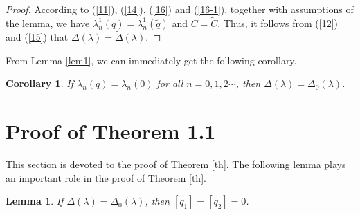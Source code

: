 \documentclass[reqno,11pt,centertags]{amsart}
\numberwithin{equation}{section}
\newtheorem{lemma}[theorem]{Lemma}
\newtheorem{corollary}[theorem]{Corollary}
\theoremstyle{definition}
\begin{document}
\begin{proof}
According to (\ref{11}), (\ref{14}), (\ref{16}) and (\ref{16-1}), together with assumptions of the lemma, we have $\lambda_{n}^{1}(q)=\lambda_{n}^{1}(\widetilde{q})$ and $C=\widetilde{C}$. Thus, it follows from (\ref{12}) and (\ref{15}) that $\Delta(\lambda)=\widetilde{\Delta}(\lambda)$.
\end{proof}


From Lemma \ref{lem1}, we can immediately get the following corollary.
\begin{corollary}\label{cor}
If $\lambda_{n}(q)=\lambda_{n}(0)$ for all $n=0,1,2\cdots$, then $\Delta(\lambda)=\Delta_{0}(\lambda)$.
\end{corollary}


	
\section{Proof of Theorem 1.1}
	
	This section is devoted to the proof of Theorem \ref{th}. The following lemma plays an important role in the proof of Theorem \ref{th}.

\begin{lemma}\label{lem2}
If $\Delta(\lambda)=\Delta_{0}(\lambda)$, then $[q_{1}]=[q_{2}]=0$.
\end{lemma}
\end{document}
